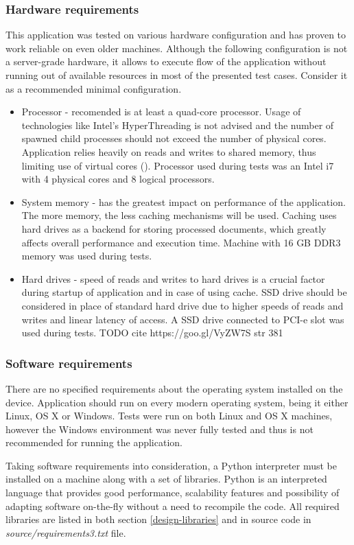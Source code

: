 \subsubsection{Hardware requirements}
This application was tested on various hardware configuration and has proven to work reliable on even older machines. Although the following configuration is not a server-grade hardware, it allows to execute flow of the application without running out of available resources in most of the presented test cases. Consider it as a recommended minimal configuration.
\begin{itemize}
	\item Processor - recomended is at least a quad-core processor. Usage of technologies like Intel's HyperThreading is not advised and the number of spawned child processes should not exceed the number of physical cores. Application relies heavily on reads and writes to shared memory, thus limiting use of virtual cores (\cite{performance_ht}). Processor used during tests was an Intel i7 with 4 physical cores and 8 logical processors.
	\item System memory - has the greatest impact on performance of the application. The more memory, the less caching mechanisms will be used. Caching uses hard drives as a backend for storing processed documents, which greatly affects overall performance and execution time. Machine with 16 GB DDR3 memory was used during tests.
	\item Hard drives - speed of reads and writes to hard drives is a crucial factor during startup of application and in case of using cache. SSD drive should be considered in place of standard hard drive due to higher speeds of reads and writes and linear latency of access. A SSD drive connected to PCI-e slot was used during tests. TODO cite https://goo.gl/VyZW7S str 381
\end{itemize}


\subsubsection{Software requirements}
There are no specified requirements about the operating system installed on the device. Application should run on every modern operating system, being it either Linux, OS X or Windows. Tests were run on both Linux and OS X machines, however the Windows environment was never fully tested and thus is not recommended for running the application.

Taking software requirements into consideration, a Python interpreter must be installed on a machine along with a set of libraries. Python is an interpreted language that provides good performance, scalability features and possibility of adapting software on-the-fly without a need to recompile the code. All required libraries are listed in both section \ref{design-libraries} and in source code in \textit{source/requirements3.txt} file.
 
